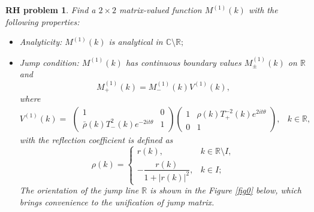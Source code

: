\documentclass[11pt]{article}
\numberwithin{equation}{section}
\newtheorem{RHP}{RH problem}
\begin{document}
\begin{RHP}
    Find a $2\times 2$ matrix-valued function $M^{(1)}(k)$ with the following properties:
\begin{itemize}
  \item Analyticity: $M^{(1)}(k)$ is analytical in $\mathbb{C}\setminus\mathbb{R};$

  \item Jump condition: $M^{(1)}(k)$ has continuous boundary values $M^{(1)}_{\pm}(k)$ on $\mathbb{R}$ and
 \begin{equation*}
M^{(1)}_+(k)=M^{(1)}_-(k)V^{(1)}(k),
\end{equation*}
where
\begin{equation}
V^{(1)}(k)=\begin{array}{ll}
\left(\begin{array}{cc}1&0\\ \bar{\rho}(k)T_-^2(k)e^{-2it\theta}&1\end{array}\right)
\left(\begin{array}{cc}1&\rho(k)T_+^{-2}(k)e^{2it\theta}\\ 0&1\end{array}\right), &k\in \mathbb{R},
\end{array} \label{3.18}
\end{equation}
with the reflection coefficient is defined as
\begin{equation}
\rho(k) =\left\{\begin{array}{ll}
r(k),& k\in 	\mathbb{R}\setminus I,\\
-\dfrac{r(k) }{1+|r(k)|^2},&k\in I;
\end{array}\right.\label{3.19}
\end{equation}
The orientation of the jump line $\mathbb{R}$ is shown in the Figure \ref{fig0} below, which brings convenience to the unification of jump matrix.


\end{itemize}
\end{RHP}
\end{document}
